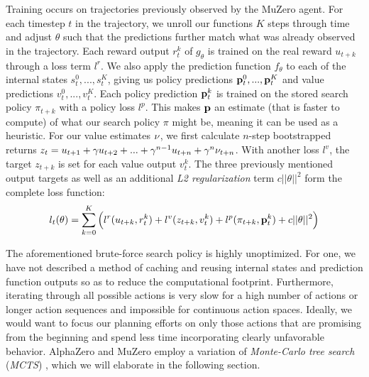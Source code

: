 Training occurs on trajectories previously observed by the MuZero agent. For each timestep $t$ in the trajectory, we unroll our functions $K$ steps through time and adjust $\theta$ such that the predictions further match what was already observed in the trajectory. Each reward output $r^k_t$ of $g_\theta$ is trained on the real reward $u_{t+k}$ through a loss term $l^r$. We also apply the prediction function $f_\theta$ to each of the internal states $s^0_t, ..., s^K_t$, giving us policy predictions $\text{\textbf{p}}^0_t, ..., \text{\textbf{p}}^K_t$ and value predictions $v^0_t, ..., v^K_t$. Each policy prediction $\text{\textbf{p}}^k_t$ is trained on the stored search policy $\pi_{t+k}$ with a policy loss $l^p$. This makes $\text{\textbf{p}}$ an estimate (that is faster to compute) of what our search policy $\pi$ might be, meaning it can be used as a heuristic. For our value estimates $\nu$, we first calculate $n$-step bootstrapped returns $z_t = u_{t+1} + \gamma u_{t+2} + ... + \gamma^{n-1} u_{t+n} + \gamma^n\nu_{t+n}$. With another loss $l^v$, the target $z_{t+k}$ is set for each value output $v^k_t$. The three previously mentioned output targets as well as an additional \textit{L2 regularization} term $c||\theta||^2$ \cite{l2-regularization} form the complete loss function:
\begin{equation*}
    l_t(\theta) = \sum^K_{k=0} \left(l^r(u_{t+k}, r_t^k) + l^v(z_{t+k}, v_t^k) + l^p(\pi_{t+k}, \text{\textbf{p}}_t^k) + c||\theta||^2\right)
\end{equation*}

The aforementioned brute-force search policy is highly unoptimized. For one, we have not described a method of caching and reusing internal states and prediction function outputs so as to reduce the computational footprint. Furthermore, iterating through all possible actions is very slow for a high number of actions or longer action sequences and impossible for continuous action spaces. Ideally, we would want to focus our planning efforts on only those actions that are promising from the beginning and spend less time incorporating clearly unfavorable behavior. AlphaZero and MuZero employ a variation of \textit{Monte-Carlo tree search} (\textit{MCTS}) \cite{mcts}, which we will elaborate in the following section.

